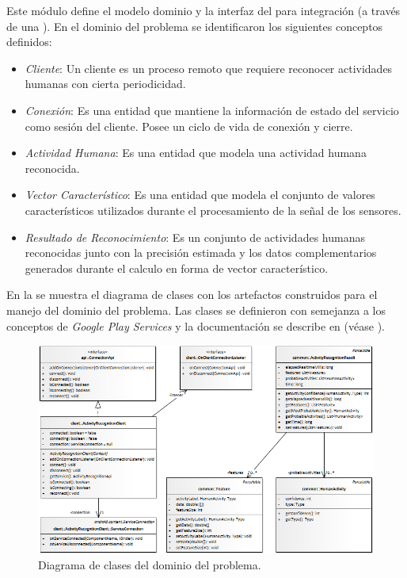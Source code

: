 Este módulo define el modelo dominio y la interfaz del para integración
(a través de una ). En el dominio del problema se identificaron
los siguientes conceptos definidos:
\begin{itemize}
\item \emph{Cliente}: Un cliente es un proceso remoto que requiere reconocer
actividades humanas con cierta periodicidad.
\item \emph{Conexión}:\emph{ }Es una entidad que mantiene la información
de estado del servicio como sesión del cliente. Posee un ciclo de
vida de conexión y cierre.
\item \emph{Actividad Humana}: Es una entidad que modela una actividad humana
reconocida.
\item \emph{Vector Característico}: Es una entidad que modela el conjunto
de valores característicos utilizados durante el procesamiento de
la señal de los sensores.
\item \emph{Resultado de Reconocimiento}: Es un conjunto de actividades
humanas reconocidas junto con la precisión estimada y los datos complementarios
generados durante el calculo en forma de vector característico.
\end{itemize}
En la  se muestra el diagrama de clases con los
artefactos construidos para el manejo del dominio del problema. Las
clases se definieron con semejanza a los conceptos de \emph{Google
Play Services} \cite{Google2016l} y la documentación se describe
en (véase \cite{GimenezYegros2016d}).

\begin{figure}
\begin{centering}
\includegraphics[width=0.8\columnwidth]{capitulo-5/graphics/class_domain}
\par\end{centering}
\caption[Diagrama de clases del dominio del problema]{\label{fig5:domain}Diagrama de clases del dominio del problema.}

\end{figure}

